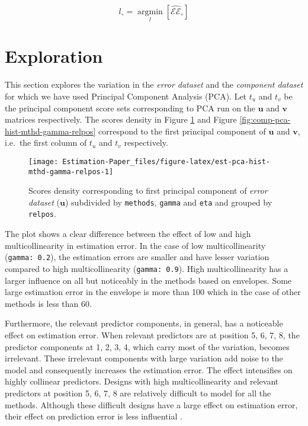 \documentclass[12pt,3p,authoryear]{elsarticle}
\begin{document}
\begin{equation}
  l_{\circ} = \operatorname*{argmin}_{l}\left[\widehat{\mathcal{EE}}_{\circ}\right]
  \label{eq:min-comp}
\end{equation}

\hypertarget{exploration}{\section{Exploration}\label{exploration}}

This section explores the variation in the \emph{error dataset} and the
\emph{component dataset} for which we have used Principal Component
Analysis (PCA). Let \(t_u\) and \(t_v\) be the principal component score
sets corresponding to PCA run on the \(\mathbf{u}\) and \(\mathbf{v}\)
matrices respectively. The scores density in Figure
\ref{fig:est-pca-hist-mthd-gamma-relpos} and Figure
\ref{fig:comp-pca-hist-mthd-gamma-relpos} correspond to the first
principal component of \(\mathbf{u}\) and \(\mathbf{v}\), i.e.~the first
column of \(t_u\) and \(t_v\) respectively.





\begin{figure}[!htb]
\texttt{[image: Estimation-Paper\_files/figure-latex/est-pca-hist-mthd-gamma-relpos-1]} \caption{Scores density corresponding to first principal component
of \emph{error dataset} (\(\mathbf{u}\)) subdivided by \texttt{methods},
\texttt{gamma} and \texttt{eta} and grouped by \texttt{relpos}.}\label{fig:est-pca-hist-mthd-gamma-relpos}
\end{figure}

The plot shows a clear difference between the effect of low and high
multicollinearity in estimation error. In the case of low
multicollinearity (\texttt{gamma:\ 0.2}), the estimation errors are
smaller and have lesser variation compared to high multicollinearity
(\texttt{gamma:\ 0.9}). High multicollinearity has a larger influence on
all but noticeably in the methods based on envelopes. Some large
estimation error in the envelope is more than 100 which in the case of
other methods is less than 60.

Furthermore, the relevant predictor components, in general, has a
noticeable effect on estimation error. When relevant predictors are at
position 5, 6, 7, 8, the predictor components at 1, 2, 3, 4, which carry
most of the variation, becomes irrelevant. These irrelevant components
with large variation add noise to the model and consequently increases
the estimation error. The effect intensifies on highly collinear
predictors. Designs with high multicollinearity and relevant predictors
at position 5, 6, 7, 8 are relatively difficult to model for all the
methods. Although these difficult designs have a large effect on
estimation error, their effect on prediction error is less influential
\citep{rimal2019pred}.
\end{document}
